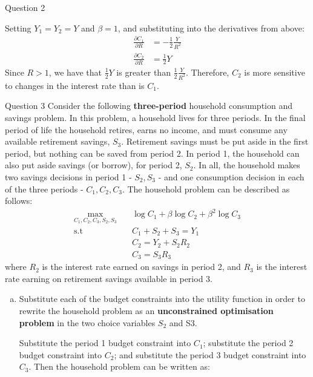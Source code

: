 \documentclass[a4paper]{article}
\newif\IfInSansMode
\begin{document}
\begin{questionbox}{Question 2}
\begin{enumerate}[(a)]
			\begin{explanationbox}
				Setting \( Y_1 = Y_2 = Y \) and \( \beta = 1 \), and substituting into the derivatives from above:
				\begin{align*}
					\frac{\partial C_1}{\partial R} &= -\frac{1}{2}\frac{Y}{R^2}\\
					\frac{\partial C_2}{\partial R} &= \frac{1}{2} Y
				\end{align*}
				Since \( R > 1 \), we have that \( \frac{1}{2}Y \) is greater than \( \frac{1}{2}\frac{Y}{R^2} \). Therefore, \( C_2 \) is more sensitive to changes in the interest rate than is \( C_1 \).
			\end{explanationbox}
		\end{enumerate}
	\end{questionbox}\pagebreak
	\begin{questionbox}{Question 3}
		Consider the following \textbf{three-period} household consumption and savings problem. In this problem, a household lives for three periods. In the final period of life the household retires, earns no income, and must consume any available retirement savings, \( S_3 \). Retirement savings must be put aside in the first period, but nothing can be saved from period 2. In period 1, the household can also put aside savings (or borrow), for period 2, \( S_2 \). In all, the household makes two savings decisions in period 1 - \( S_2,S_3 \) - and one consumption decision in each of the three periods - \( C_1,C_2,C_3 \). The household problem can be described as follows:
		\begin{align*}
			\max_{C_1,C_2,C_3,S_2,S_3} \quad &\log C_1 + \beta\log C_2 + \beta^2\log C_3\\
			\text{s.t} \quad & C_1 + S_2 + S_3 = Y_1\\
			&C_2 = Y_2 + S_2R_2\\
			&C_3 = S_3 R_3
		\end{align*}
		where \( R_2 \) is the interest rate earned on savings in period 2, and \( R_3 \) is the interest rate earning on retirement savings available in period 3.
		\begin{enumerate}[(a)]
			\item Substitute each of the budget constraints into the utility function in order to rewrite the household problem as an \textbf{unconstrained optimisation problem} in the two choice variables \( S_2 \) and S3.
			\begin{explanationbox}
				Substitute the period 1 budget constraint into \( C_1 \); substitute the period 2 budget constraint into \( C_2 \); and substitute the period 3 budget constraint into \( C_3 \). Then the household problem can be written as:

\end{explanationbox}
\end{enumerate}
\end{questionbox}
\end{document}
